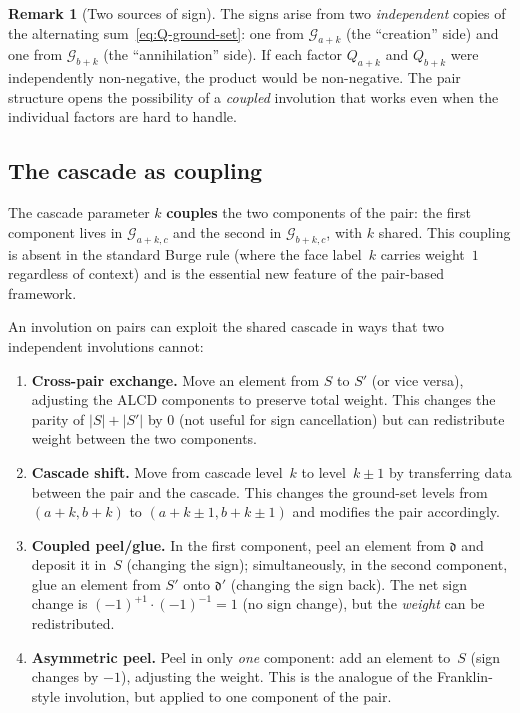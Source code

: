 \documentclass[11pt]{article}
\theoremstyle{plain}
\theoremstyle{definition}
\newtheorem{remark}[theorem]{Remark}
\begin{document}
\begin{remark}[Two sources of sign]
\label{rem:two-signs}
The signs arise from two \emph{independent} copies of the
alternating sum~\eqref{eq:Q-ground-set}: one from
$\mathcal{G}_{a+k}$ (the ``creation'' side) and one from
$\mathcal{G}_{b+k}$ (the ``annihilation'' side).  If each
factor $Q_{a+k}$ and $Q_{b+k}$ were independently non-negative,
the product would be non-negative.  The pair structure opens the
possibility of a \emph{coupled} involution that works even when
the individual factors are hard to handle.
\end{remark}


\subsection{The cascade as coupling}

The cascade parameter $k$ \textbf{couples} the two components of
the pair: the first component lives in $\mathcal{G}_{a+k,c}$ and
the second in $\mathcal{G}_{b+k,c}$, with $k$ shared.  This
coupling is absent in the standard Burge rule (where the face
label~$k$ carries weight~$1$ regardless of context) and is the
essential new feature of the pair-based framework.

An involution on pairs can exploit the shared cascade in ways that
two independent involutions cannot:
\begin{enumerate}
  \item \textbf{Cross-pair exchange.}
    Move an element from $S$ to $S'$ (or vice versa), adjusting
    the ALCD components to preserve total weight.  This changes
    the parity of $|S| + |S'|$ by $0$ (not useful for sign
    cancellation) but can redistribute weight between the two
    components.

  \item \textbf{Cascade shift.}
    Move from cascade level~$k$ to level~$k \pm 1$ by
    transferring data between the pair and the cascade.  This
    changes the ground-set levels from
    $(a+k, b+k)$ to $(a+k \pm 1, b+k \pm 1)$ and modifies the
    pair accordingly.

  \item \textbf{Coupled peel/glue.}
    In the first component, peel an element from
    $\mathfrak{d}$ and deposit it in~$S$ (changing the sign);
    simultaneously, in the second component, glue an element
    from $S'$ onto $\mathfrak{d}'$ (changing the sign back).
    The net sign change is $(-1)^{+1}\cdot(-1)^{-1} = 1$
    (no sign change), but the \emph{weight} can be redistributed.

  \item \textbf{Asymmetric peel.}
    Peel in only \emph{one} component: add an element to~$S$
    (sign changes by $-1$), adjusting the weight.  This is the
    analogue of the Franklin-style involution, but applied to one
    component of the pair.
\end{enumerate}
\end{document}
